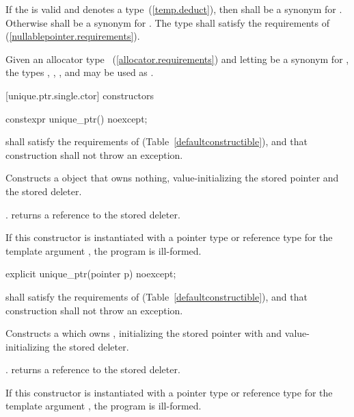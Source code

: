 \pnum
If the   is valid and denotes a
type~(\ref{temp.deduct}), then  shall be a synonym for . Otherwise
 shall be a synonym for . The type  shall
satisfy the requirements of  (\ref{nullablepointer.requirements}).

\pnum
\enterexample Given an allocator type ~(\ref{allocator.requirements}) and
letting  be a synonym for , the types ,
, , and 
may be used as . \exitexample

[unique.ptr.single.ctor]{ constructors}

\begin{itemdecl}
constexpr unique_ptr() noexcept;
\end{itemdecl}

\begin{itemdescr}
\pnum
\requires {} shall
satisfy the requirements of  (Table~\ref{defaultconstructible}),
and that construction shall not throw an exception.

\pnum
\effects Constructs a  object that owns
nothing, value-initializing the stored pointer and the stored deleter.

\pnum
\postconditions {}. 
returns a reference to the stored deleter.

\pnum
\notes If this constructor is instantiated with a pointer type or reference type
for the template argument , the program is ill-formed.
\end{itemdescr}

\begin{itemdecl}
explicit unique_ptr(pointer p) noexcept;
\end{itemdecl}

\begin{itemdescr}
\pnum
\requires {} shall
satisfy the requirements of  (Table~\ref{defaultconstructible}),
and that construction shall not throw an exception.

\pnum
\effects Constructs a  which owns
, initializing the stored pointer with  and
value-initializing the stored deleter.

\pnum
\postconditions {}. 
returns a reference to the stored deleter.

\pnum
\notes If this constructor is instantiated with a pointer type or reference type
for the template argument , the program is ill-formed.
\end{itemdescr}

